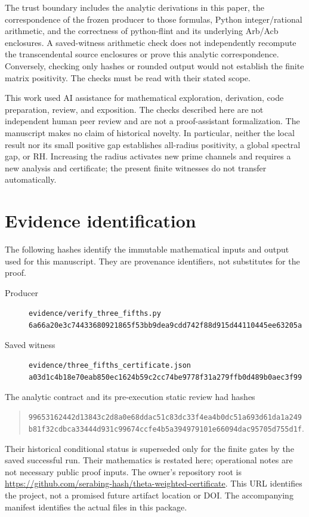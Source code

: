 \documentclass[11pt]{article}
\begin{document}
The trust boundary includes the analytic derivations in this paper, the correspondence of the frozen producer to those formulas, Python integer/rational arithmetic, and the correctness of python-flint and its underlying Arb/Acb enclosures. A saved-witness arithmetic check does not independently recompute the transcendental source enclosures or prove this analytic correspondence. Conversely, checking only hashes or rounded output would not establish the finite matrix positivity. The checks must be read with their stated scope.



This work used AI assistance for mathematical exploration, derivation, code preparation, review, and exposition. The checks described here are not independent human peer review and are not a proof-assistant formalization. The manuscript makes no claim of historical novelty. In particular, neither the local result nor its small positive gap establishes all-radius positivity, a global spectral gap, or RH. Increasing the radius activates new prime channels and requires a new analysis and certificate; the present finite witnesses do not transfer automatically.

\appendix
\section{Evidence identification}
The following hashes identify the immutable mathematical inputs and output used for this manuscript. They are provenance identifiers, not substitutes for the proof.
\begin{description}
\item[Producer] \texttt{evidence/verify\_three\_fifths.py}\\
\nolinkurl{6a66a20e3c74433680921865f53bb9dea9cdd742f88d915d44110445ee63205a}
\item[Saved witness] \texttt{evidence/three\_fifths\_certificate.json}\\
\nolinkurl{a03d1c4b18e70eab850ec1624b59c2cc74be9778f31a279ffb0d489b0aec3f99}
\end{description}
The analytic contract and its pre-execution static review had hashes
\begin{quote}\small
\nolinkurl{99653162442d13843c2d8a0e68ddac51c83dc33f4ea4b0dc51a693d61da1a249}\\
\nolinkurl{b81f32cdbca33444d931c99674ccfe4b5a394979101e66094dac95705d755d1f}.
\end{quote}
Their historical conditional status is superseded only for the finite gates by the saved successful run. Their mathematics is restated here; operational notes are not necessary public proof inputs. The owner's repository root is
\url{https://github.com/serabing-hash/theta-weighted-certificate}.
This URL identifies the project, not a promised future artifact location or DOI. The accompanying manifest identifies the actual files in this package.
\end{document}
